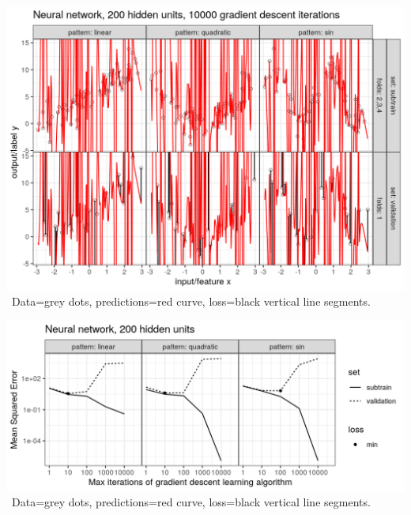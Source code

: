 \begin{frame}
  \includegraphics[width=\textwidth]{figure-overfitting-pred-units=200-maxit=10000.png}
\
Data=grey dots, predictions=red curve, loss=black vertical line segments.
\end{frame}


\begin{frame}
  \includegraphics[width=\textwidth]{figure-overfitting-data-loss-200.png}
\
Data=grey dots, predictions=red curve, loss=black vertical line segments.
\end{frame}

